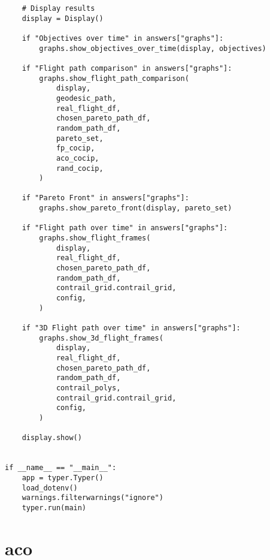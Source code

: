\begin{verbatim}
    # Display results
    display = Display()

    if "Objectives over time" in answers["graphs"]:
        graphs.show_objectives_over_time(display, objectives)

    if "Flight path comparison" in answers["graphs"]:
        graphs.show_flight_path_comparison(
            display,
            geodesic_path,
            real_flight_df,
            chosen_pareto_path_df,
            random_path_df,
            pareto_set,
            fp_cocip,
            aco_cocip,
            rand_cocip,
        )

    if "Pareto Front" in answers["graphs"]:
        graphs.show_pareto_front(display, pareto_set)

    if "Flight path over time" in answers["graphs"]:
        graphs.show_flight_frames(
            display,
            real_flight_df,
            chosen_pareto_path_df,
            random_path_df,
            contrail_grid.contrail_grid,
            config,
        )

    if "3D Flight path over time" in answers["graphs"]:
        graphs.show_3d_flight_frames(
            display,
            real_flight_df,
            chosen_pareto_path_df,
            random_path_df,
            contrail_polys,
            contrail_grid.contrail_grid,
            config,
        )

    display.show()


if __name__ == "__main__":
    app = typer.Typer()
    load_dotenv()
    warnings.filterwarnings("ignore")
    typer.run(main)

\end{verbatim}
\section{aco}
